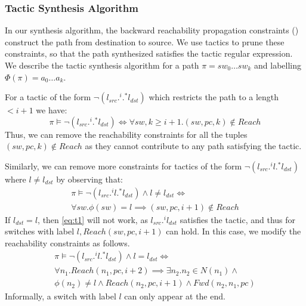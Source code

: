 \subsubsection{Tactic Synthesis Algorithm}
In our synthesis algorithm, the backward reachability propagation constraints () 
construct the path from destination to source. We use tactics to prune these constraints, so that
the path synthesized satisfies the tactic regular expression.  
We describe the tactic synthesis algorithm
for a path $\pi = sw_0 \ldots sw_k$ and labelling $\Phi(\pi) = a_0 \ldots a_k$. 

For a tactic of the form $\neg (l_{src} .^i .^* l_{dst})$ which restricts the path to a length $ < i + 1$ we have: 
\begin{equation}
	\pi \vDash \neg (l_{src} .^i .^* l_{dst}) \Leftrightarrow \forall sw,k \geq i + 1. (sw,pc,k) \notin Reach
\end{equation}
Thus, we can remove the reachability constraints for 
all the tuples $(sw,pc,k) \notin Reach$
as they cannot contribute to any path satisfying the tactic.  

Similarly, we can remove more constraints for tactics
of the form $\neg (l_{src}  .^i l .^* l_{dst})$ where $l \not= l_{dst}$ by observing that:
\begin{multline} \label{eq:t1}
\pi \vDash \neg (l_{src} .^i l .^* l_{dst}) \wedge l \not= l_{dst} \Leftrightarrow \\ \forall sw. \phi(sw) = l \implies (sw, pc, i + 1) \notin Reach
\end{multline}
If $l_{dst} = l$, then \cref{eq:t1} will not work, as $l_{src} .^i l_{dst}$ 
satisfies the tactic, and thus for switches with label $l,Reach(sw,pc,i+1)$ can hold.
In this case, we modify the reachability constraints 
as follows.
\begin{multline} \label{eq:t2}
 \pi \vDash \neg (l_{src} .^i l .^* l_{dst}) \wedge l = l_{dst} \Leftrightarrow \\ 
 \forall n_1. Reach(n_1,pc,i + 2) \implies \exists n_2.  n_2 \in N(n_1) \wedge \\ \phi(n_2) \not= l \wedge 
 Reach(n_2,pc,i+1) \wedge Fwd(n_2,n_1,pc)
\end{multline}
Informally, a switch with label $l$ can only appear at the end.


